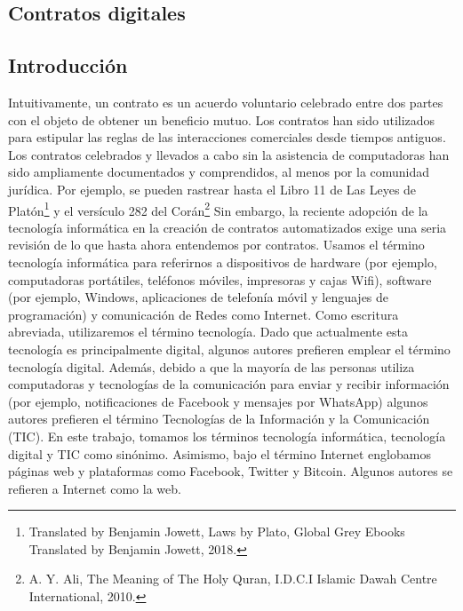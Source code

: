 \documentclass[12pt]{report} %
\begin{document}
\begin{itemize}
\chapter{Contratos digitales }
\label{Contratos digitales}

\section{Introducción}

Intuitivamente, un contrato es un acuerdo voluntario celebrado entre dos partes con el objeto de obtener un beneficio mutuo. Los contratos han sido utilizados para estipular las reglas de las interacciones comerciales desde tiempos antiguos. Los contratos celebrados y llevados a cabo sin la asistencia de computadoras han sido ampliamente documentados y comprendidos, al menos por la comunidad jurídica. Por ejemplo, se pueden rastrear hasta el Libro 11 de Las Leyes de Platón\footnote{Translated by Benjamin Jowett, Laws by Plato, Global Grey Ebooks Translated by Benjamin Jowett, 2018.}  y el versículo 282 del Corán\footnote{A. Y. Ali, The Meaning of The Holy Quran, I.D.C.I Islamic Dawah Centre International, 2010.} Sin embargo, la reciente adopción de la tecnología informática en la creación de contratos automatizados exige una seria revisión de lo que hasta ahora entendemos por contratos. Usamos el término tecnología informática para referirnos a dispositivos de hardware (por ejemplo, computadoras portátiles, teléfonos móviles, impresoras y cajas Wifi), software (por ejemplo, Windows, aplicaciones de telefonía móvil y lenguajes de programación) y comunicación de Redes como Internet. Como escritura abreviada, utilizaremos el término tecnología. Dado que actualmente esta tecnología es principalmente digital, algunos autores prefieren emplear el término tecnología digital. Además, debido a que la mayoría de las personas utiliza computadoras y tecnologías de la comunicación para enviar y recibir información (por ejemplo, notificaciones de Facebook y mensajes por WhatsApp) algunos autores prefieren el término Tecnologías de la Información y la Comunicación (TIC). En este trabajo, tomamos los términos tecnología informática, tecnología digital y TIC como sinónimo. Asimismo, bajo el término Internet englobamos páginas web y plataformas como Facebook, Twitter y Bitcoin. Algunos autores se refieren a Internet como la web.


\end{itemize}
\end{document}
